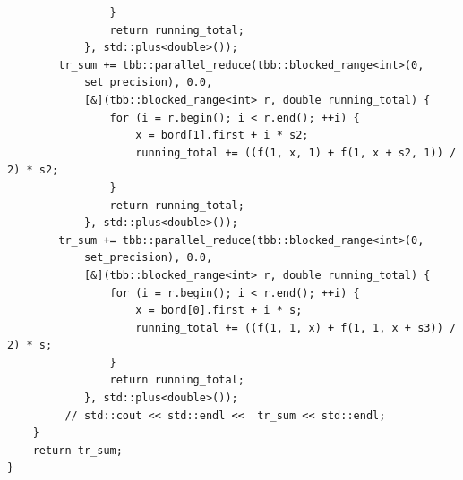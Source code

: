 \documentclass{report}
\begin{document}
\begin{verbatim}
                }
                return running_total;
            }, std::plus<double>());
        tr_sum += tbb::parallel_reduce(tbb::blocked_range<int>(0,
            set_precision), 0.0,
            [&](tbb::blocked_range<int> r, double running_total) {
                for (i = r.begin(); i < r.end(); ++i) {
                    x = bord[1].first + i * s2;
                    running_total += ((f(1, x, 1) + f(1, x + s2, 1)) / 2) * s2;
                }
                return running_total;
            }, std::plus<double>());
        tr_sum += tbb::parallel_reduce(tbb::blocked_range<int>(0,
            set_precision), 0.0,
            [&](tbb::blocked_range<int> r, double running_total) {
                for (i = r.begin(); i < r.end(); ++i) {
                    x = bord[0].first + i * s;
                    running_total += ((f(1, 1, x) + f(1, 1, x + s3)) / 2) * s;
                }
                return running_total;
            }, std::plus<double>());
         // std::cout << std::endl <<  tr_sum << std::endl;
    }
    return tr_sum;
}
 	\end{verbatim}
	
\end{document}
